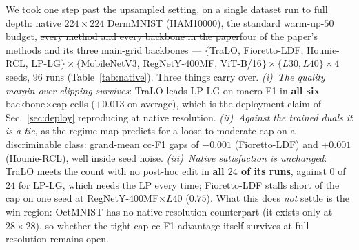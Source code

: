 \documentclass[10pt]{article}
\newcommand{\del}[1]{{\color{red}\sout{#1}}}
\begin{document}
{\color{blue}
We took one step past the upsampled setting, on a single dataset run to full depth:
native $224{\times}224$ DermMNIST (HAM10000), the standard warm-up-$50$ budget,
\del{every method and every backbone in the paper}{\color{blue}four of the paper's
methods and its three main-grid backbones} --- $\{$TraLO, Fioretto-LDF, Hounie-RCL, LP-LG$\}
\times \{$MobileNetV3, RegNetY-400MF, ViT-B/16$\} \times \{L30, L40\} \times 4$ seeds,
$96$ runs (Table~\ref{tab:native}). Three things carry over. \emph{(i)~The quality margin
over clipping survives}: TraLO leads LP-LG on macro-F1 in \textbf{all six}
backbone$\times$cap cells ($+0.013$ on average), which is the deployment claim of
Sec.~\ref{sec:deploy} reproducing at native resolution. \emph{(ii)~Against the trained
duals it is a tie}, as the regime map predicts for a loose-to-moderate cap on a
discriminable class: grand-mean cc-F1 gaps of $-0.001$ (Fioretto-LDF) and $+0.001$
(Hounie-RCL), well inside seed noise. \emph{(iii)~Native satisfaction is unchanged}:
TraLO meets the count with no post-hoc edit in \textbf{all $24$ of its runs}, against
$0$ of $24$ for LP-LG, which needs the LP every time; Fioretto-LDF stalls short of the
cap on one seed at RegNetY-400MF$\times L40$ ($0.75$). What this does \emph{not} settle
is the win region: OctMNIST has no native-resolution counterpart (it exists only at
$28{\times}28$), so whether the tight-cap cc-F1 advantage itself survives at full
resolution remains open.}
\end{document}
